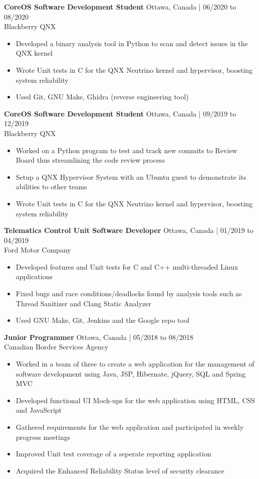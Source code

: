 \documentclass[10pt]{article}
\begin{document}
\textbf{CoreOS Software Development Student} \hfill Ottawa, Canada | 06/2020 to 08/2020 \\
Blackberry QNX
\begin{itemize}
    \item Developed a binary analysis tool in Python to scan and detect issues in the QNX kernel
    \item Wrote Unit tests in C for the QNX Neutrino kernel and hypervisor, boosting system reliability
    \item Used Git, GNU Make, Ghidra (reverse engineering tool)
\end{itemize}

\textbf{CoreOS Software Development Student} \hfill Ottawa, Canada | 09/2019 to 12/2019 \\
Blackberry QNX
\begin{itemize}
    \item Worked on a Python program to test and track new commits to Review Board thus streamlining the code review process
    \item Setup a QNX Hypervisor System with an Ubuntu guest to demonstrate its abilities to other teams
    \item Wrote Unit tests in C for the QNX Neutrino kernel and hypervisor, boosting system reliability
\end{itemize}

\textbf{Telematics Control Unit Software Developer} \hfill Ottawa, Canada | 01/2019 to 04/2019 \\
Ford Motor Company
\begin{itemize}[noitemsep]
    \item Developed features and Unit tests for C and C++ multi-threaded Linux applications
    \item Fixed bugs and race conditions/deadlocks found by analysis tools such as Thread Sanitizer and Clang Static Analyzer
    \item Used GNU Make, Git, Jenkins and the Google repo tool
\end{itemize}

\textbf{Junior Programmer} \hfill Ottawa, Canada | 05/2018 to 08/2018 \\
Canadian Border Services Agency
\begin{itemize}
    \item Worked in a team of three to create a web application for the management of software development using Java, JSP, Hibernate, jQuery, SQL and Spring MVC
    \item Developed functional UI Mock-ups for the web application using HTML, CSS and JavaScript
    \item Gathered requirements for the web application and participated in weekly progress meetings
    \item Improved Unit test coverage of a seperate reporting application
    \item Acquired the Enhanced Reliability Status level of security clearance
\end{itemize}
\end{document}
